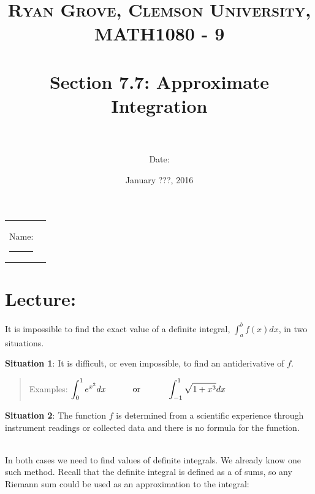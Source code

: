 \documentclass[paper=a4, fontsize=11pt]{scrartcl} %
\title{	
\normalfont \normalsize 
\textsc{Ryan Grove, Clemson University, MATH1080 - 9} \\ [25pt] %
\horrule{0.5pt} \\[0.4cm] %
\huge Section 7.7: Approximate Integration \\ %
\horrule{2pt} \\[0.5cm] %
}
\author{Date:} %
\date{\normalsize January ???, 2016} %
\numberwithin{equation}{section} %
\numberwithin{figure}{section} %
\numberwithin{table}{section} %
\newcommand{\ds}{\displaystyle}
\begin{document}
\maketitle %

\begin{flushleft}
\begin{tabular}{l l}
Name: \rule{3.2in}{.01cm}  & {}%
\end{tabular}
\end{flushleft}


\section*{\textbf{Lecture:}}

It is impossible to find the exact value of a definite integral, $\ds\int_a^b f(x) dx$, in two situations.\\
\indent

\textbf{Situation 1}: It is difficult, or even impossible, to find an antiderivative of $f$.
\begin{quote}
\flushleft
\hspace{0.53in} Examples: \quad \quad \quad $\ds\int_0^1 e^{x^2}dx \quad \hspace{0.25in} \text{ or } \hspace{0.25in} \quad \ds\int_{-1}^1 \ds\sqrt{1+x^3}dx$
\end{quote}
\indent

\textbf{Situation 2}: The function $f$ is determined from a scientific experience through instrument readings or collected data and there is no formula for the function.\\
\indent

\indent\\

In both cases we need to find \underline{\hspace{1.25in}} values of definite integrals. We already know one such method. Recall that the definite integral is defined as a \underline{\hspace{1in}} of \underline{\hspace{1.25in}} sums, so any Riemann sum could be used as an approximation to the integral:\\
\indent
\end{document}
